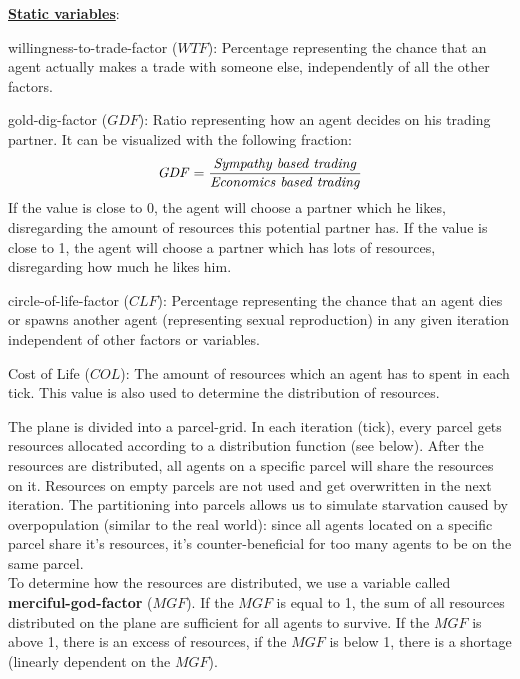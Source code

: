 \documentclass{JASSS}
\newcommand{\gdf}{\mathit{GDF}}
\newcommand{\wtf}{\mathit{WTF}}
\newcommand{\clf}{\mathit{CLF}}
\newcommand{\col}{\mathit{COL}}
\newcommand{\mgf}{\mathit{MGF}}
\begin{document}
\textbf{\underline{Static variables}}:
\begin{description*}
	\item[willingness-to-trade-factor ($\wtf$):]
		Percentage representing the chance that an agent actually makes a trade with someone else, independently of all the other factors.

	\item[gold-dig-factor ($\gdf$):]
		Ratio representing how an agent decides on his trading partner. It can be visualized with the following fraction:
		\begin{equation*}
			\gdf = \frac{\text{\textit{Sympathy based trading}}}{\text{\textit{Economics based trading}}}
		\end{equation*}
		If the value is close to 0, the agent will choose a partner which he likes, disregarding the amount of resources this potential partner has. If the value is close to 1, the agent will choose a partner which has lots of resources, disregarding how much he likes him.

	\item[circle-of-life-factor ($\clf$):]
		Percentage representing the chance that an agent dies or spawns another agent (representing sexual reproduction) in any given iteration independent of other factors or variables.
		
	\item[Cost of Life ($\col$):]
		The amount of resources which an agent has to spent in each tick. This value is also used to determine the distribution of resources.
\end{description*}

The plane is divided into a parcel-grid. In each iteration (tick), every parcel gets resources allocated according to a distribution function (see below). After the resources are distributed, all agents on a specific parcel will share the resources on it. Resources on empty parcels are not used and get overwritten in the next iteration. The partitioning into parcels allows us to simulate starvation caused by overpopulation (similar to the real world): since all agents located on a specific parcel share it's resources, it's counter-beneficial for too many agents to be on the same parcel.\\

To determine how the resources are distributed, we use a variable called \textbf{merciful-god-factor} ($\mgf$). If the $\mgf$ is equal to 1, the sum of all resources distributed on the plane are sufficient for all agents to survive. If the $\mgf$ is above 1, there is an excess of resources, if the $\mgf$ is below 1, there is a shortage (linearly dependent on the $\mgf$).
\end{document}
